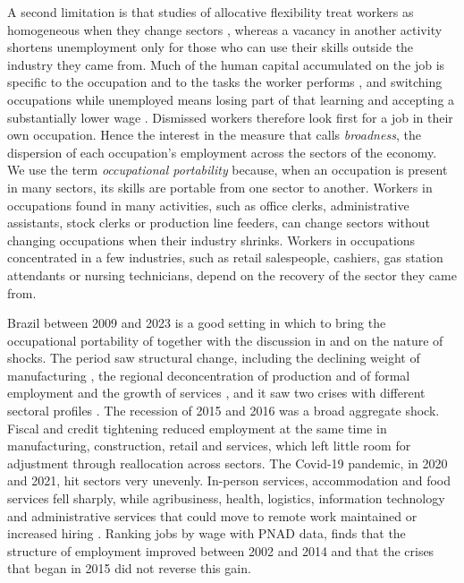 \documentclass[11pt,a4paper]{article}
\let\citetorig\citet
\let\citeporig\citep
\renewcommand{\citet}[1]{{\color{citeblue}\citetorig{#1}}}
\renewcommand{\citep}[1]{{\color{citeblue}\citeporig{#1}}}
\begin{document}
A second limitation is that studies of allocative flexibility treat workers as homogeneous when they change sectors \citep{layard1991, barros1997ppp, staduto2010}, whereas a vacancy in another activity shortens unemployment only for those who can use their skills outside the industry they came from. Much of the human capital accumulated on the job is specific to the occupation and to the tasks the worker performs \citep{poletaev2008, kambourov2009, gathmann2010}, and switching occupations while unemployed means losing part of that learning and accepting a substantially lower wage \citep{longhi2013, wiczer2015, carrillotudela2023}. Dismissed workers therefore look first for a job in their own occupation. Hence the interest in the measure that \citet{darougheh2022, darougheh2024} calls \emph{broadness}, the dispersion of each occupation's employment across the sectors of the economy. We use the term \emph{occupational portability} because, when an occupation is present in many sectors, its skills are portable from one sector to another. Workers in occupations found in many activities, such as office clerks, administrative assistants, stock clerks or production line feeders, can change sectors without changing occupations when their industry shrinks. Workers in occupations concentrated in a few industries, such as retail salespeople, cashiers, gas station attendants or nursing technicians, depend on the recovery of the sector they came from.

Brazil between 2009 and 2023 is a good setting in which to bring the occupational portability of \citet{darougheh2024} together with the discussion in \citet{lilien1982} and \citet{abraham1986} on the nature of shocks. The period saw structural change, including the declining weight of manufacturing \citep{rodrik2016}, the regional deconcentration of production and of formal employment \citep{saboia2013, macedo2021} and the growth of services \citep{jacinto2015}, and it saw two crises with different sectoral profiles \citep{corseuil2020}. The recession of 2015 and 2016 was a broad aggregate shock. Fiscal and credit tightening reduced employment at the same time in manufacturing, construction, retail and services, which left little room for adjustment through reallocation across sectors. The Covid-19 pandemic, in 2020 and 2021, hit sectors very unevenly. In-person services, accommodation and food services fell sharply, while agribusiness, health, logistics, information technology and administrative services that could move to remote work maintained or increased hiring \citep{corseuil2020}. Ranking jobs by wage with PNAD data, \citet{rodriguessilveira2023} finds that the structure of employment improved between 2002 and 2014 and that the crises that began in 2015 did not reverse this gain.
\end{document}
